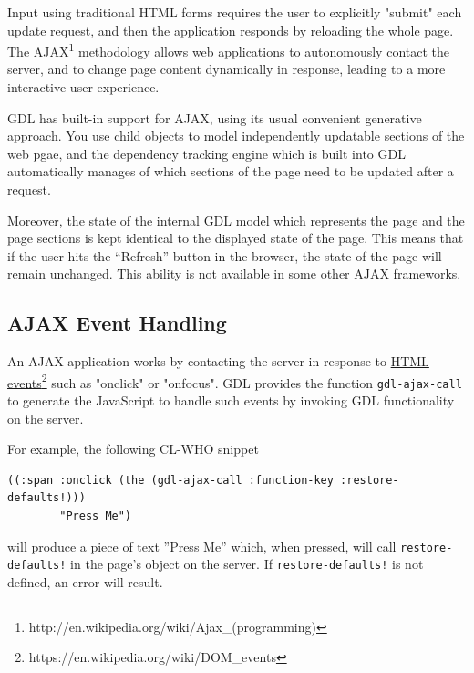 \documentclass [11pt]{book}
\begin{document}
Input using traditional HTML forms requires the user to explicitly "submit" each update
request, and then the application responds by reloading the whole page.  The \href{http://en.wikipedia.org/wiki/Ajax\_(programming)}{AJAX}\footnote{http://en.wikipedia.org/wiki/Ajax\_(programming)} methodology allows web
applications to autonomously contact the server, and to change page content dynamically in
response, leading to a more interactive user experience.



GDL has built-in support for AJAX, using its usual convenient generative approach.
You use child objects to model independently updatable sections of the web pgae, and the dependency
tracking engine which is built into GDL automatically manages of which sections of the
page need to be updated after a request.



Moreover, the state of the internal GDL model which
represents the page and the page sections is kept identical to the
displayed state of the page. This means that if the user hits the
``Refresh'' button in the browser, the state of the page will remain
unchanged. This ability is not available in some other AJAX
frameworks.



\subsection{AJAX Event Handling}

\label{subsec:ajaxeventhandling}



An AJAX application works by contacting the server
in response to \href{https://en.wikipedia.org/wiki/DOM\_events}{HTML events}\footnote{https://en.wikipedia.org/wiki/DOM\_events} such as "onclick"
or "onfocus".  GDL provides the function \texttt{gdl-ajax-call} to generate
the JavaScript to handle such events by invoking GDL functionality on the server.



For example, the following CL-WHO snippet

\begin{verbatim}((:span :onclick (the (gdl-ajax-call :function-key :restore-defaults!)))
        "Press Me")
\end{verbatim}will produce a piece of text ''Press Me'' which, when pressed, will call \texttt{restore-defaults!}
in the page's object on the server. If \texttt{restore-defaults!} is not defined, an error will result.
\end{document}
